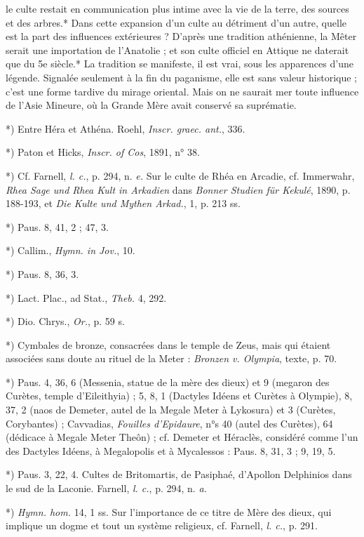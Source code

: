 \documentclass[a4paper, 11pt, oneside, polutonikogreek, french]{article}
\begin{document}
le culte restait en communication plus intime avec la vie de la terre, des sources et des arbres.* Dans cette expansion d'un culte au détriment d'un autre, quelle est la part des influences extérieures ? D'après une tradition athénienne, la Mêter serait une importation de l'Anatolie ; et son culte officiel en Attique ne daterait que du 5e siècle.* La tradition se manifeste, il est vrai, sous les apparences d'une légende. Signalée seulement à la fin du paganisme, elle est sans valeur historique ; c'est une forme tardive du mirage oriental. Mais on ne saurait mer toute influence de l'Asie Mineure, où la Grande Mère avait conservé sa suprématie.

*) Entre Héra et Athéna. Roehl, \emph{Inscr. graec. ant.}, 336.

*) Paton et Hicks, \emph{Inscr. of Cos}, 1891, n° 38.

*) Cf. Farnell, \emph{l. c.}, p. 294, n. \emph{e.} Sur le culte de Rhéa en Arcadie, cf. Immerwahr, \emph{Rhea Sage und Rhea Kult in Arkadien} dans \emph{Bonner Studien für Kekulé}, 1890, p. 188-193, et \emph{Die Kulte und Mythen Arkad.}, 1, p. 213 ss.

*) Paus. 8, 41, 2 ; 47, 3.

*) Callim., \emph{Hymn. in Jov.}, 10.

*) Paus. 8, 36, 3.

*) Lact. Plac., ad Stat., \emph{Theb.} 4, 292.

*) Dio. Chrys., \emph{Or.}, p. 59 s.

*) Cymbales de bronze, consacrées dans le temple de Zeus, mais qui étaient associées sans doute au rituel de la Meter : \emph{Bronzen v. Olympia}, texte, p. 70.

*) Paus. 4, 36, 6 (Messenia, statue de la mère des dieux) et 9 (megaron des Curètes, temple d'Eileithyia) ; 5, 8, 1 (Dactyles Idéens et Curètes à Olympie), 8, 37, 2 (naos de Demeter, autel de la Megale Meter à Lykosura) et 3 (Curètes, Corybantes) ; Cavvadias, \emph{Fouilles d'Epidaure}, n°s 40 (autel des Curètes), 64 (dédicace à Megale Meter Theôn) ; cf. Demeter et Héraclès, considéré comme l'un des Dactyles Idéens, à Megalopolis et à Mycalessos : Paus. 8, 31, 3 ; 9, 19, 5.

*) Paus. 3, 22, 4. Cultes de Britomartis, de Pasiphaé, d'Apollon Delphinios dans le sud de la Laconie. Farnell, \emph{l. c.}, p. 294, n. \emph{a.}

*) \emph{Hymn. hom.} 14, 1 ss. Sur l'importance de ce titre de Mère des dieux, qui implique un dogme et tout un système religieux, cf. Farnell, \emph{l. c.}, p. 291.
\end{document}
